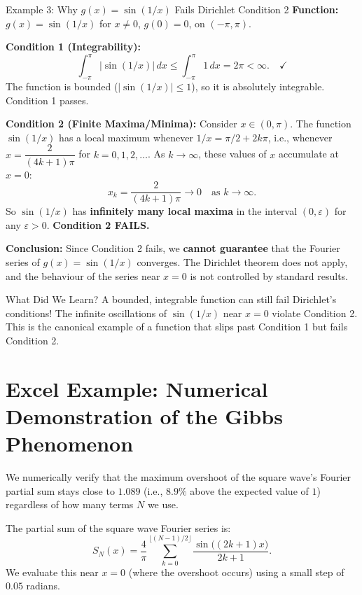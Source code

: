 \documentclass[12pt,a4paper]{article}
\begin{document}
\begin{infobox}{Example 3: Why $g(x)=\sin(1/x)$ Fails Dirichlet Condition 2}
\textbf{Function:} $g(x) = \sin(1/x)$ for $x \ne 0$, $g(0)=0$, on $(-\pi,\pi)$.

\medskip
\textbf{Condition 1 (Integrability):}
\[
   \int_{-\pi}^{\pi} |\sin(1/x)|\,dx \leq \int_{-\pi}^{\pi} 1\,dx = 2\pi < \infty. \quad \checkmark
\]
The function is bounded ($|\sin(1/x)|\leq 1$), so it is absolutely integrable. Condition 1 passes.

\medskip
\textbf{Condition 2 (Finite Maxima/Minima):}
Consider $x \in (0,\pi)$. The function $\sin(1/x)$ has a local maximum whenever $1/x = \pi/2 + 2k\pi$, i.e., whenever $x = \dfrac{2}{(4k+1)\pi}$ for $k=0,1,2,\ldots$. As $k \to \infty$, these values of $x$ accumulate at $x=0$:
\[
   x_k = \frac{2}{(4k+1)\pi} \to 0 \quad \text{as } k\to\infty.
\]
So $\sin(1/x)$ has \textbf{infinitely many local maxima} in the interval $(0, \varepsilon)$ for any $\varepsilon > 0$. \textbf{Condition 2 FAILS.}

\medskip
\textbf{Conclusion:}
Since Condition 2 fails, we \textbf{cannot guarantee} that the Fourier series of $g(x) = \sin(1/x)$ converges. The Dirichlet theorem does not apply, and the behaviour of the series near $x=0$ is not controlled by standard results.
\end{infobox}

\begin{learnbox}{What Did We Learn?}
A bounded, integrable function can still fail Dirichlet's conditions! The infinite oscillations of $\sin(1/x)$ near $x=0$ violate Condition 2. This is the canonical example of a function that slips past Condition 1 but fails Condition 2.
\end{learnbox}

\section{Excel Example: Numerical Demonstration of the Gibbs Phenomenon}

We numerically verify that the maximum overshoot of the square wave's Fourier partial sum stays close to $1.089$ (i.e., $8.9\%$ above the expected value of $1$) regardless of how many terms $N$ we use.

\medskip
The partial sum of the square wave Fourier series is:
\[
   S_N(x) = \frac{4}{\pi}\sum_{k=0}^{\lfloor(N-1)/2\rfloor} \frac{\sin\bigl((2k+1)x\bigr)}{2k+1}.
\]
We evaluate this near $x=0$ (where the overshoot occurs) using a small step of $0.05$ radians.
\end{document}
